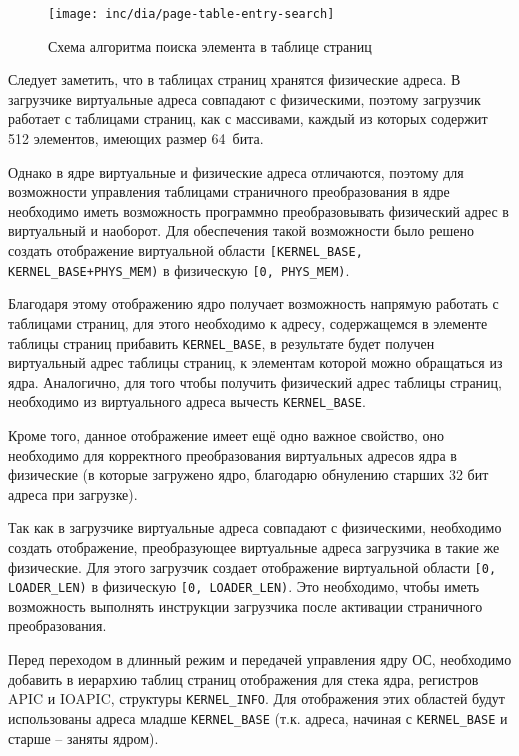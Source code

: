 \begin{figure}[ht!]
  \centering
  \texttt{[image: inc/dia/page-table-entry-search]}
  \caption{Схема алгоритма поиска элемента в таблице страниц}
  \label{fig:page-table-entry-search}
\end{figure}

Следует заметить, что в таблицах страниц хранятся физические адреса. В загрузчике виртуальные
адреса совпадают с физическими, поэтому загрузчик работает с таблицами страниц, как с массивами,
каждый из которых содержит 512 элементов, имеющих размер 64~бита.

Однако в ядре виртуальные и физические адреса отличаются, поэтому для возможности управления
таблицами страничного преобразования в ядре необходимо иметь возможность программно преобразовывать
физический адрес в виртуальный и наоборот. Для обеспечения такой возможности было решено
создать отображение виртуальной области \texttt{[KERNEL\_BASE, KERNEL\_BASE+PHYS\_MEM)}
в физическую \texttt{[0, PHYS\_MEM)}.

Благодаря этому отображению ядро получает возможность напрямую работать с таблицами страниц,
для этого необходимо к адресу, содержащемся в элементе таблицы страниц прибавить \texttt{KERNEL\_BASE},
в результате будет получен виртуальный адрес таблицы страниц, к элементам которой можно обращаться из
ядра. Аналогично, для того чтобы получить физический адрес таблицы страниц, необходимо из виртуального
адреса вычесть \texttt{KERNEL\_BASE}.

Кроме того, данное отображение имеет ещё одно важное свойство, оно необходимо для корректного
преобразования виртуальных адресов ядра в физические (в которые загружено ядро, благодарю обнулению
старших 32 бит адреса при загрузке).

Так как в загрузчике виртуальные адреса совпадают с физическими, необходимо создать отображение,
преобразующее виртуальные адреса загрузчика в такие же физические. Для этого загрузчик создает
отображение виртуальной области \texttt{[0, LOADER\_LEN)} в физическую \texttt{[0, LOADER\_LEN)}. Это необходимо,
чтобы иметь возможность выполнять инструкции загрузчика после активации страничного преобразования.

Перед переходом в длинный режим и передачей управления ядру ОС, необходимо добавить в иерархию таблиц
страниц отображения для стека ядра, регистров APIC и IOAPIC, структуры \texttt{KERNEL\_INFO}.
Для отображения этих областей будут использованы адреса младше \texttt{KERNEL\_BASE} (т.к. адреса,
начиная с \texttt{KERNEL\_BASE} и старше -- заняты ядром).


